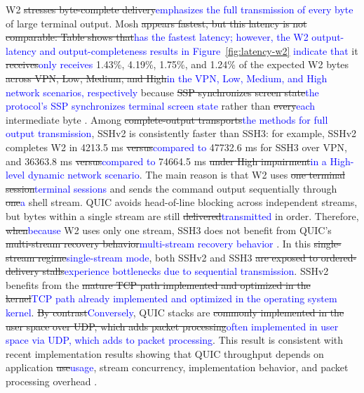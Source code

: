 W2 \sout{stresses byte-complete delivery}\textcolor{blue}{emphasizes the full transmission of every byte} of large terminal output. Mosh \sout{appears fastest, but this latency is not comparable: Table shows that}\textcolor{blue}{has the fastest latency; however, the W2 output-latency and output-completeness results in Figure~\ref{fig:latency-w2} indicate that} it \sout{receives}\textcolor{blue}{only receives} 1.43\%, 4.19\%, 1.75\%, and 1.24\% of the expected W2 bytes \sout{across VPN, Low, Medium, and High}\textcolor{blue}{in the VPN, Low, Medium, and High network scenarios, respectively} because \sout{SSP synchronizes screen state}\textcolor{blue}{the protocol's SSP synchronizes terminal screen state} rather than \sout{every}\textcolor{blue}{each} intermediate byte \cite{Winstein2012}. Among \sout{complete-output transports}\textcolor{blue}{the methods for full output transmission}, SSHv2 is consistently faster than SSH3: for example, SSHv2 completes W2 in 4213.5 ms \sout{versus}\textcolor{blue}{compared to} 47732.6 ms for SSH3 over VPN, and 36363.8 ms \sout{versus}\textcolor{blue}{compared to} 74664.5 ms \sout{under High impairment}\textcolor{blue}{in a High-level dynamic network scenario}. The main reason is that W2 uses \sout{one terminal session}\textcolor{blue}{terminal sessions} and sends the command output sequentially through \sout{one}\textcolor{blue}{a} shell stream. QUIC avoids head-of-line blocking across independent streams, but bytes within a single stream are still \sout{delivered}\textcolor{blue}{transmitted} in order. Therefore, \sout{when}\textcolor{blue}{because} W2 uses only one stream, SSH3 does not benefit from QUIC's \sout{multi-stream recovery behavior}\textcolor{blue}{multi-stream recovery behavior} \cite{Iyengar2021}. In this \sout{single-stream regime}\textcolor{blue}{single-stream mode}, both SSHv2 and SSH3 \sout{are exposed to ordered-delivery stalls}\textcolor{blue}{experience bottlenecks due to sequential transmission}. SSHv2 benefits from the \sout{mature TCP path implemented and optimized in the kernel}\textcolor{blue}{TCP path already implemented and optimized in the operating system kernel}. \sout{By contrast}\textcolor{blue}{Conversely}, QUIC stacks are \sout{commonly implemented in the user space over UDP, which adds packet processing}\textcolor{blue}{often implemented in user space via UDP, which adds to packet processing}. This result is consistent with recent implementation results showing that QUIC throughput depends on application \sout{use}\textcolor{blue}{usage}, stream concurrency, implementation behavior, and packet processing overhead \cite{Konig2025}.

